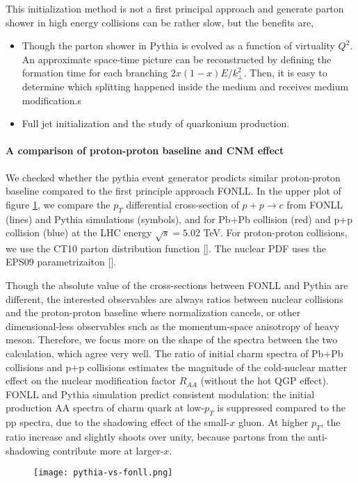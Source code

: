 This initialization method is not a first principal approach and generate parton shower in high energy collisions can be rather slow, but the benefits are,
\begin{itemize}
\item Though the parton shower in Pythia is evolved as a function of virtuality $Q^2$. 
An approximate space-time picture can be reconstructed by defining the formation time for each branching $2x(1-x)E/k_\perp^2$. Then, it is easy to determine which splitting happened inside the medium and receives medium modification.s
\item Full jet initialization and the study of quarkonium production.
\end{itemize}

\paragraph{A comparison of proton-proton baseline and CNM effect}
We checked whether the pythia event generator prodicts similar proton-proton baseline compared to the first principle approach FONLL.
In the upper plot of figure \ref{fig:pythia-fonll}, we compare the $p_T$ differential cross-section of $p+p\rightarrow c$ from FONLL (lines) and Pythia simulations (symbols), and for Pb+Pb collision (red) and p+p collision (blue) at the LHC energy $\sqrt{s}=5.02$ TeV.
For proton-proton collisions, we use the CT10 parton distribution function [].
The nuclear PDF uses the EPS09 parametrizaiton [].

Though the absolute value of the cross-sections between FONLL and Pythia are different, the interested observables are always ratios between nuclear collisions and the proton-proton baseline where normalization cancels, or other dimensional-less observables such as the momentum-space anisotropy of heavy meson.
Therefore, we focus more on the shape of the spectra between the two calculation, which agree very well.
The ratio of initial charm spectra of Pb+Pb collisions and p+p collisions estimates the magnitude of the cold-nuclear matter effect on the nuclear modification factor $R_{AA}$ (without the hot QGP effect).
FONLL and Pythia simulation predict consistent modulation: the initial production AA spectra of charm quark at low-$p_T$ is suppressed compared to the pp spectra, due to the shadowing effect of the small-$x$ gluon. 
At higher $p_T$, the ratio increase and slightly shoots over unity, because partons from the anti-shadowing contribute more at larger-$x$.

\begin{figure}
\centering
\texttt{[image: pythia-vs-fonll.png]}
\caption{}
\label{fig:pythia-fonll}
\end{figure}

